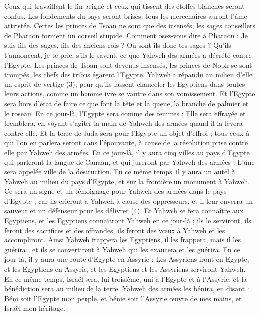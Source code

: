 \begin{multicols}{2}
Ceux qui travaillent le lin peigné et ceux qui tissent des étoffes blanches seront confus.
Les fondements du pays seront brisés, tous les mercenaires auront l’âme attristée.
Certes les princes de Tsoan ne sont que des insensés, les sages conseillers de Pharaon forment un conseil stupide. Comment osez-vous dire à Pharaon : Je suis fils des sages, fils des anciens rois ?
Où sont-ils donc tes sages ? Qu’ils t'annoncent, je te prie, s'ils le savent, ce que Yahweh des armées a décrété contre l'Egypte.
Les princes de Tsoan sont devenus insensés, les princes de Noph se sont trompés, les chefs des tribus égarent l’Egypte.
Yahweh a répandu au milieu d'elle un esprit de vertige (3), pour qu’ils fassent chanceler les Egyptiens dans toutes leurs actions, comme un homme ivre se vautre dans son vomissement.
Et l'Egypte sera hors d’état de faire ce que font la tête et la queue, la branche de palmier et le roseau.
En ce jour-là, l'Egypte sera comme des femmes : Elle sera effrayée et tremblera, en voyant s’agiter la main de Yahweh des armées quand il la lèvera contre elle.
Et la terre de Juda sera pour l'Egypte un objet d’effroi ; tous ceux à qui l’on en parlera seront dans l’épouvante, à cause de la résolution prise contre elle par Yahweh des armées.
En ce jour-là, il y aura cinq villes au pays d'Egypte qui parleront la langue de Canaan, et qui jureront par Yahweh des armées : L'une sera appelée ville de la destruction.
En ce même temps, il y aura un autel à Yahweh au milieu du pays d'Egypte, et sur la frontière un monument à Yahweh.
Ce sera un signe et un témoignage pour Yahweh des armées dans le pays d'Egypte ; car ils crieront à Yahweh à cause des oppresseurs, et il leur enverra un sauveur et un défenseur pour les délivrer (4).
Et Yahweh se fera connaître aux Egyptiens, et les Egyptiens connaîtront Yahweh en ce jour-là ; ils le serviront, ils feront des sacrifices et des offrandes, ils feront des vœux à Yahweh et les accompliront.
Ainsi Yahweh frappera les Egyptiens, il les frappera, mais il les guérira ; et ils se convertiront à Yahweh qui les exaucera et les guérira.
En ce jour-là, il y aura une route d’Egypte en Assyrie : Les Assyriens iront en Egypte, et les Egyptiens en Assyrie, et les Egyptiens et les Assyriens serviront Yahweh.
En ce même temps, Israël sera, lui troisième, uni à l'Egypte et à l'Assyrie, et la bénédiction sera au milieu de la terre.
Yahweh des armées les bénira, en disant : Béni soit l'Egypte mon peuple, et bénie soit l'Assyrie œuvre de mes mains, et Israël mon héritage.

\end{multicols}
